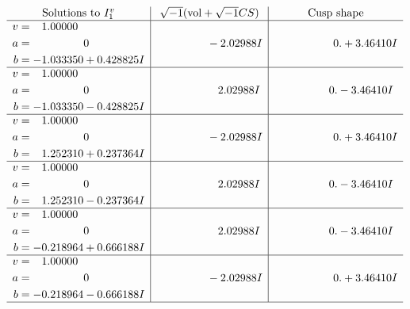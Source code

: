 \documentclass[1p]{elsarticle_modified}
\theoremstyle{definition}
\newcommand{\I}{\sqrt{-1}}
\begin{document}
$$\begin{array}{c|c|c}  
\text{Solutions to }I^v_{1}& \I (\text{vol} + \sqrt{-1}CS) & \text{Cusp shape}\\
 \hline 
\begin{aligned}
v &= \phantom{-}1.00000\phantom{ +0.000000I} \\
a &= \phantom{-0.000000 } 0 \\
b &= -1.033350 + 0.428825 I\end{aligned}
 & \phantom{-0.000000 } -2.02988 I & \phantom{-0.000000 -}0. + 3.46410 I \\ \hline\begin{aligned}
v &= \phantom{-}1.00000\phantom{ +0.000000I} \\
a &= \phantom{-0.000000 } 0 \\
b &= -1.033350 - 0.428825 I\end{aligned}
 & \phantom{-0.000000 -}2.02988 I & \phantom{-0.000000 } 0. - 3.46410 I \\ \hline\begin{aligned}
v &= \phantom{-}1.00000\phantom{ +0.000000I} \\
a &= \phantom{-0.000000 } 0 \\
b &= \phantom{-}1.252310 + 0.237364 I\end{aligned}
 & \phantom{-0.000000 } -2.02988 I & \phantom{-0.000000 -}0. + 3.46410 I \\ \hline\begin{aligned}
v &= \phantom{-}1.00000\phantom{ +0.000000I} \\
a &= \phantom{-0.000000 } 0 \\
b &= \phantom{-}1.252310 - 0.237364 I\end{aligned}
 & \phantom{-0.000000 -}2.02988 I & \phantom{-0.000000 } 0. - 3.46410 I \\ \hline\begin{aligned}
v &= \phantom{-}1.00000\phantom{ +0.000000I} \\
a &= \phantom{-0.000000 } 0 \\
b &= -0.218964 + 0.666188 I\end{aligned}
 & \phantom{-0.000000 -}2.02988 I & \phantom{-0.000000 } 0. - 3.46410 I \\ \hline\begin{aligned}
v &= \phantom{-}1.00000\phantom{ +0.000000I} \\
a &= \phantom{-0.000000 } 0 \\
b &= -0.218964 - 0.666188 I\end{aligned}
 & \phantom{-0.000000 } -2.02988 I & \phantom{-0.000000 -}0. + 3.46410 I\\
 \hline 
 \end{array}$$\newpage
\end{document}
